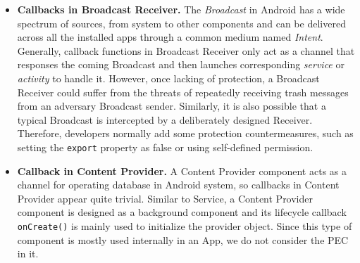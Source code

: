 \begin{itemize}

    \item \textbf{Callbacks in Broadcast Receiver.} 
        The \textit{Broadcast} in Android has a wide spectrum of sources, from system to other components and can be delivered across all the installed apps through a common medium named \textit{Intent}. 
        Generally, callback functions in Broadcast Receiver only act as a channel that responses the coming Broadcast and then launches corresponding \textit{service} or \textit{activity} to handle it. 
    However, once lacking of protection, a Broadcast Receiver could suffer from the threats of repeatedly receiving trash messages from an adversary Broadcast sender. 
    Similarly, it is also possible that a typical Broadcast is intercepted by a deliberately designed Receiver. 
    Therefore, developers normally add some protection countermeasures, such as setting the \texttt{export} property as false or using self-defined permission. 

    \item \textbf{Callback in Content Provider. }
        A Content Provider component acts as a channel for operating database in Android system, so callbacks in Content Provider appear quite trivial. 
        Similar to Service, a Content Provider component is designed as a background component and 
        its lifecycle callback \texttt{onCreate()} is mainly used to initialize the provider object. 
        Since this type of component is mostly used internally in an App, we do not consider the PEC in it. 


\end{itemize}


